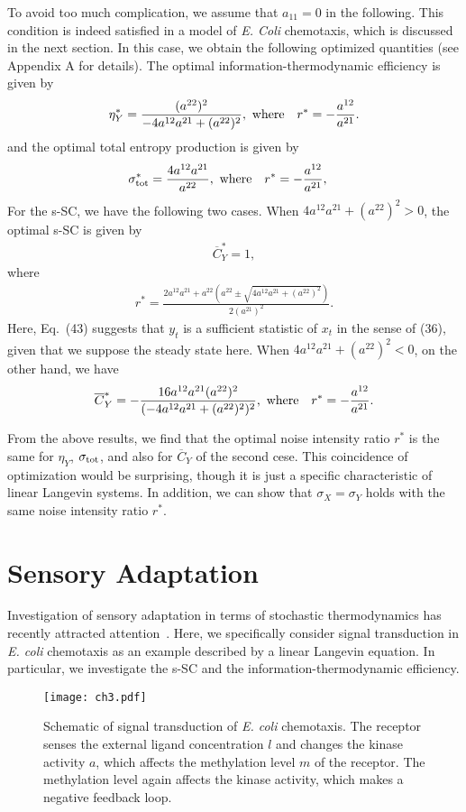 \documentclass[%
 reprint,
 amsmath,amssymb,
 aps,
]{revtex4-1}
\newcommand{\balign}[1]{\begin{align} #1 \end{align}}
\theoremstyle{plain}
\begin{document}
To avoid too much complication, we assume that $a_{11} = 0$ in the following.  This condition is indeed satisfied in a model of \textit{E. Coli} chemotaxis, which is discussed in the next section.
In this case, we obtain the following optimized quantities (see  Appendix A for details). The optimal information-thermodynamic efficiency is given by
\balign{
\eta^{\ast}_{Y}=\frac{(a^{22})^2}{-4a^{12}a^{21}+(a^{22})^2}, \ {\rm where}\ \ \ r^{\ast}=-\frac{a^{12}}{a^{21}}.
}
and the optimal total entropy production is given by
\balign{
\sigma^{\ast}_{\rm tot}&=\frac{4a^{12}a^{21}}{a^{22}}, \ {\rm where}\ \ \ r^{\ast}=-\frac{a^{12}}{a^{21}},
}
For the s-SC, we have the following two cases. When $4a^{12}a^{21}+(a^{22})^2>0$, the optimal s-SC is given by
\balign{
\overline{C}^{\ast}_Y=1,
}
where
\balign{
r^{\ast}=\frac{2a^{12}a^{21}+a^{22}(a^{22}\pm\sqrt{4a^{12}a^{21}+(a^{22})^2})}{2(a^{21})^2}.
}
Here, Eq.~(43) suggests that $y_t$ is a sufficient statistic of $x_t$ in the sense of (36), given that we suppose the steady state here. When $4a^{12}a^{21}+(a^{22})^2<0$, on the other hand, we have
\balign{
\overline{C}^{\ast}_Y=-\frac{16a^{12}a^{21}(a^{22})^2}{(-4a^{12}a^{21}+(a^{22})^2)^2}, \ {\rm where}\ \ \ r^{\ast}=-\frac{a^{12}}{a^{21}}.
}


From the above results, we find that the optimal noise intensity ratio $r^{\ast}$ is the same for $\eta_{Y}$, $\sigma_{\rm tot}$, and also for $\overline{C}_Y$ of the second cese.
This coincidence of optimization would be surprising, though it is just a specific characteristic of linear Langevin systems. In addition, we can show that $\sigma_{X} = \sigma_{Y}$ holds with the same noise intensity ratio $r^\ast$.
\section{\label{sec:BC}Sensory Adaptation}
Investigation of sensory adaptation in terms of stochastic thermodynamics has recently attracted attention~\cite{Barato2013,Itoecoli, Hartich2016, Sartori2014}. Here, we specifically consider signal transduction in {\it E. coli} chemotaxis as an example described by a linear Langevin equation. In particular, we investigate the s-SC and the information-thermodynamic efficiency.
\begin{figure}[b]
\texttt{[image: ch3.pdf]}
\caption{\label{fig:chemo}Schematic of signal transduction of {\it E. coli} chemotaxis. The receptor senses the external ligand concentration $l$ and changes the kinase activity $a$, which affects  the methylation level $m$ of the receptor. The methylation level again affects the kinase activity, which makes a negative feedback loop.}
\end{figure}
\end{document}
